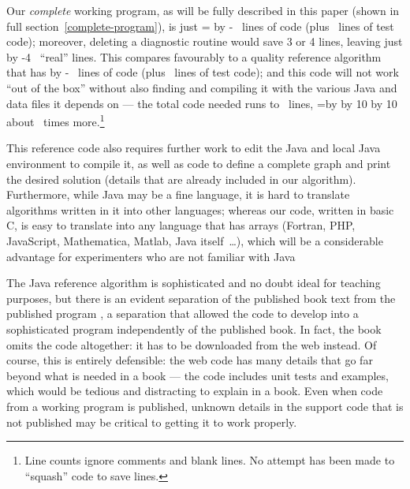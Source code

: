 \documentclass[prodmode,acmtecs]{acmsmall} %
\begin{document}
\newcount\linesofcode
Our \emph{complete\/} working program, as will be fully described in this paper (shown in full section~\ref{complete-program}), is just 
\newcount\denom \denom=\linesofcode
\newcount\testcode 
{} \advance\linesofcode by -\testcode
\the\linesofcode\ lines of code  (plus \the\testcode\ lines of test code); moreover, deleting a diagnostic routine would save 3 or 4 lines, leaving just
\advance \linesofcode by -4 \the\linesofcode\ ``real'' lines. This compares favourably to a quality reference algorithm \cite{sedgewickcode} that has 
 \advance\linesofcode by -\testcode
\the\linesofcode\ lines of code (plus \the\testcode\ lines of test code); and this code will not work ``out of the box'' without also finding and compiling it with the various Java and data files it depends on --- the total code needed runs to   
\the\linesofcode\ lines,  
\newcount\ratio \ratio=\linesofcode \divide\ratio by \denom \divide \ratio by 10 \multiply \ratio by 10
about \the\ratio\ times more.\footnote{Line counts ignore comments and blank lines. No attempt has been made to ``squash'' code to save lines.} 

This reference code also requires further work to edit the Java and local Java environment to compile it, as well as code to define a complete graph and print the desired solution (details that are already included in our algorithm). Furthermore, while Java may be a fine language, it is hard to translate algorithms written in it into other languages; whereas our code, written in basic C, is easy to translate into any language that has arrays (Fortran, PHP, JavaScript, Mathematica, Matlab, Java itself~\ldots), which will be a considerable advantage for experimenters who are not familiar with Java

The Java reference algorithm is sophisticated and no doubt ideal for teaching purposes, but there is an evident separation of the published book text \cite{sedgewickbook} from the published program \cite{sedgewickcode}, a separation that allowed the code to develop into a sophisticated program independently of the published book. In fact, the book omits the code altogether: it has to be downloaded from the web instead. Of course, this is entirely defensible: the web code has many details that go far beyond what is needed in a book --- the code includes unit tests and examples, which would be tedious and distracting to explain in a book. Even when code from a working program is published, unknown details in the support code that is not published may be critical to getting it to work properly.
\end{document}
